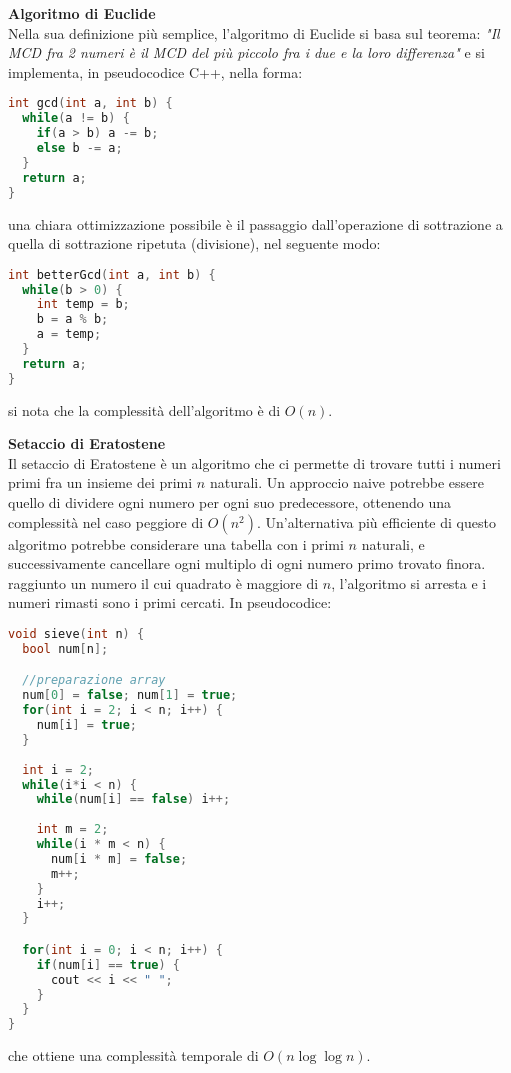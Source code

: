 \documentclass[a4paper,12pt]{article}
\begin{document}
\textbf{Algoritmo di Euclide} \\
Nella sua definizione più semplice, l'algoritmo di Euclide si basa sul teorema:
\textit{"Il MCD fra 2 numeri è il MCD del più piccolo fra i due e la loro differenza"}
e si implementa, in pseudocodice C++, nella forma:
\begin{lstlisting}[language=C++]
int gcd(int a, int b) {
  while(a != b) {
    if(a > b) a -= b;
    else b -= a;
  }
  return a;
}
\end{lstlisting}

una chiara ottimizzazione possibile è il passaggio dall'operazione di sottrazione a quella di sottrazione ripetuta
(divisione), nel seguente modo:

\begin{lstlisting}[language=C++]
int betterGcd(int a, int b) {
  while(b > 0) {
    int temp = b;
    b = a % b;
    a = temp;
  }
  return a;
}
\end{lstlisting}

si nota che la complessità dell'algoritmo è di $O(n)$.
\par\medskip
\textbf{Setaccio di Eratostene} \\
Il setaccio di Eratostene è un algoritmo che ci permette di trovare tutti i numeri primi fra un insieme dei
primi $n$ naturali. Un approccio naive potrebbe essere quello di dividere ogni numero per ogni suo predecessore,
ottenendo una complessità nel caso peggiore di $O(n^2)$. Un'alternativa più efficiente di questo algoritmo
potrebbe considerare una tabella con i primi $n$ naturali, e successivamente cancellare ogni multiplo di ogni 
numero primo trovato finora. raggiunto un numero il cui quadrato è maggiore di $n$, l'algoritmo si arresta e
i numeri rimasti sono i primi cercati. In pseudocodice:
\begin{lstlisting}[language=C++]
void sieve(int n) {
  bool num[n];

  //preparazione array
  num[0] = false; num[1] = true;
  for(int i = 2; i < n; i++) {
    num[i] = true;
  }
  
  int i = 2;
  while(i*i < n) {
    while(num[i] == false) i++;
    
    int m = 2;
    while(i * m < n) {
      num[i * m] = false;
      m++;
    }
    i++;
  }

  for(int i = 0; i < n; i++) {
    if(num[i] == true) {
      cout << i << " ";
    }
  }
}
\end{lstlisting}

che ottiene una complessità temporale di $O(n\log{\log{n}})$.
\end{document}
